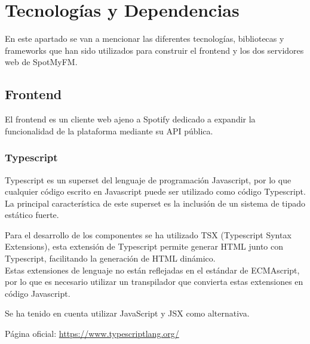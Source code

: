 
\vspace{-0.35cm}



\hypertarget{tecnologuxedas-y-dependencias}{%
\section{Tecnologías y
Dependencias}\label{tecnologuxedas-y-dependencias}}

En este apartado se van a mencionar las diferentes tecnologías, bibliotecas y frameworks que han sido utilizados para construir el frontend y los dos servidores web de SpotMyFM.

\hypertarget{frontend}{%
\subsection{Frontend}\label{frontend}}
El frontend es un cliente web ajeno a Spotify dedicado a expandir la funcionalidad de la plataforma mediante su API pública.

\hypertarget{typescript}{%
\subsubsection{\texorpdfstring{Typescript
}{Typescript }}\label{typescript}}

Typescript es un superset del lenguaje de programación Javascript, por
lo que cualquier código escrito en Javascript puede ser utilizado como
código Typescript. La principal característica de este superset es la
inclusión de un sistema de tipado estático fuerte.

Para el desarrollo de los componentes se ha utilizado TSX (Typescript
Syntax Extensions), esta extensión de Typescript permite generar HTML
junto con Typescript, facilitando la generación de HTML dinámico.\\
Estas extensiones de lenguaje no están reflejadas en el estándar de
ECMAscript, por lo que es necesario utilizar un transpilador que
convierta estas extensiones en código Javascript.

Se ha tenido en cuenta utilizar JavaScript y JSX como alternativa.

Página oficial: \href{https://www.typescriptlang.org/}{https://www.typescriptlang.org/}


